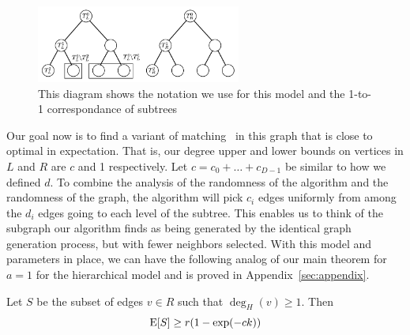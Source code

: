 \begin{figure}[h]
\centering
\includegraphics[width=0.6\textwidth]{images/hierarchy_tree.png}
\begin{minipage}[h]{0.7\textwidth}
\caption{This diagram shows the notation we use for this model and the 1-to-1 correspondance of subtrees}\label{fig:hierarchy}
\end{minipage}
\end{figure}

Our goal now is to find a variant of matching~\cite{Gabow1983} in this
graph that is close to optimal in expectation. That is, our degree
upper and lower bounds on vertices in $L$ and $R$ are $c$ and 1
respectively. Let $c = c_0 + \ldots + c_{D-1}$ be similar to how we
defined $d$.  To combine the analysis of the randomness of the
algorithm and the randomness of the graph, the algorithm will pick
$c_{i}$ edges uniformly from among the $d_{i}$ edges going to each
level of the subtree. This enables us to think of the subgraph our
algorithm finds as being generated by the identical graph generation
process, but with fewer neighbors selected. With this model and
parameters in place, we can have the following analog of our main
theorem for $a=1$ for the hierarchical model and is proved in Appendix~\ref{sec:appendix}.

\begin{thm}
Let $S$ be the subset of edges $v\in R$ such that $\deg_H(v) \geq 1$. Then
\[ \text{E}[S] \geq r(1-\exp(-ck)) \]
\end{thm}

